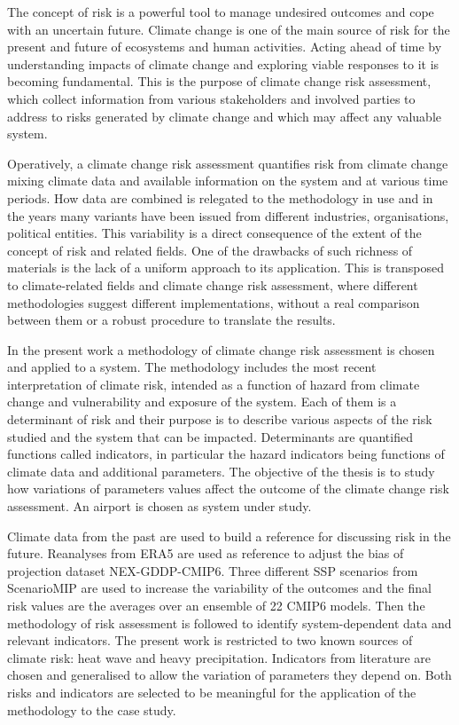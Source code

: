 The concept of risk is a powerful tool to manage undesired outcomes and cope with an uncertain future. Climate change is one of the main source of risk for the present and future of ecosystems and human activities. Acting ahead of time by understanding impacts of climate change and exploring viable responses to it is becoming fundamental.
This is the purpose of climate change risk assessment, which collect information from various stakeholders and involved parties to address to risks generated by climate change and which may affect any valuable system.

Operatively, a climate change risk assessment quantifies risk from climate change mixing climate data and available information on the system and at various time periods. How data are combined is relegated to the methodology in use and in the years many variants have been issued from different industries, organisations, political entities. This variability is a direct consequence of the extent of the concept of risk and related fields. One of the drawbacks of such richness of materials is the lack of a uniform approach to its application. This is transposed to climate-related fields and climate change risk assessment, where different methodologies suggest different implementations, without a real comparison between them or a robust procedure to translate the results.

In the present work a methodology of climate change risk assessment is chosen and applied to a system. The methodology includes the most recent interpretation of climate risk, intended as a function of hazard from climate change and vulnerability and exposure of the system. Each of them is a determinant of risk and their purpose is to describe various aspects of the risk studied and the system that can be impacted. Determinants are quantified functions called indicators, in particular the hazard indicators being functions of climate data and additional parameters.
The objective of the thesis is to study how variations of parameters values affect the outcome of the climate change risk assessment. An airport is chosen as system under study.

Climate data from the past are used to build a reference for discussing risk in the future. Reanalyses from ERA5 are used as reference to adjust the bias of projection dataset NEX-GDDP-CMIP6. Three different SSP scenarios from ScenarioMIP are used to increase the variability of the outcomes and the final risk values are the averages over an ensemble of 22 CMIP6 models.
Then the methodology of risk assessment is followed to identify system-dependent data and relevant indicators. The present work is restricted to two known sources of climate risk: heat wave and heavy precipitation. Indicators from literature are chosen and generalised to allow the variation of parameters they depend on. Both risks and indicators are selected to be meaningful for the application of the methodology to the case study.

